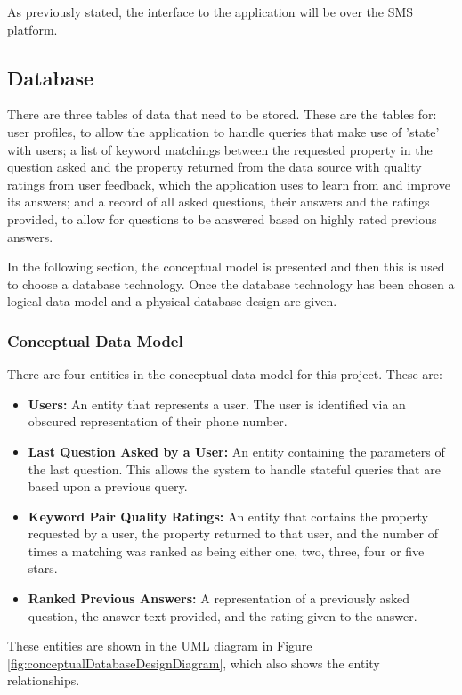 \documentclass[authoryearcitations]{UoYCSproject}
\begin{document}
As previously stated, the interface to the application will be over the SMS platform.

\subsection{Database}
There are three tables of data that need to be stored.  These are the tables for: user profiles, to allow the application to handle queries that make use of 'state' with users; a list of keyword matchings between the requested property in the question asked and the property returned from the data source with quality ratings from user feedback, which the application uses to learn from and improve its answers; and a record of all asked questions, their answers and the ratings provided, to allow for questions to be answered based on highly rated previous answers.  

In the following section, the conceptual model is presented and then this is used to choose a database technology. Once the database technology has been chosen a logical data model and a physical database design are given.

\subsubsection{Conceptual Data Model}
There are four entities in the conceptual data model for this project.  These are:

\begin{itemize}
  \item {\bf Users:} An entity that represents a user. The user is identified via an obscured representation of their phone number.
  \item {\bf Last Question Asked by a User:} An entity containing the parameters of the last question.  This allows the system to handle stateful queries that are based upon a previous query.
  \item {\bf Keyword Pair Quality Ratings:} An entity that contains the property requested by a user, the property returned to that user, and the number of times a matching was ranked as being either one, two, three, four or five stars.
  \item {\bf Ranked Previous Answers:} A representation of a previously asked question, the answer text provided, and the rating given to the answer.
\end{itemize}

These entities are shown in the UML diagram in Figure \ref{fig:conceptualDatabaseDesignDiagram}, which also shows the entity relationships.
\end{document}
